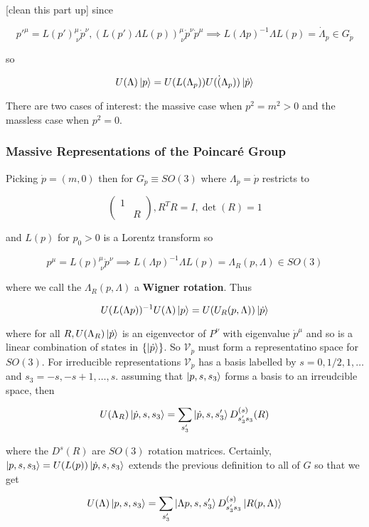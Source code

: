 \documentclass{article}
\theoremstyle{definition}
\begin{document}
[clean this part up] since

$$ p'^\mu = L(p')^\mu_{\ \nu} \dot{p}^\nu, (L(p') \Lambda L(p))^\mu_{\ \nu}
\dot{p}^\nu \dot{p}^\mu \implies L(\Lambda p)^{-1} \Lambda L(p) =
\dot{\Lambda}_p \in G_{\dot{p}} $$

so

$$ U(\Lambda) \ket{p} = U(L(\Lambda_p)) U(\dot(\Lambda_p)) \ket{\dot{p}} $$

There are two cases of interest: the massive case when $p^2 = m^2 > 0$ and the
massless case when $p^2 = 0$.

\subsubsection{Massive Representations of the Poincar\'{e} Group}

Picking $\dot{p} = (m, 0)$ then for  $G_{\dot{p}} \equiv SO(3)$ where
$\Lambda_{\dot{p}} = \dot{p}$ restricts to

$$
\begin{pmatrix}
  1 & \\
  & R
\end{pmatrix}
, R^T R = I, \det(R) = 1 $$

and $L(p)$ for $p_0 > 0$ is a Lorentz transform so

$$ p^\mu = L(p)^\mu_{\ \nu} \dot{p}^\nu \implies L(\Lambda p)^{-1} \Lambda L(p)
= \Lambda_R(p, \Lambda) \in SO(3) $$

where we call the $\Lambda_R(p, \Lambda)$ a \textbf{Wigner rotation}. Thus

$$ U(L(\Lambda p))^{-1} U(\Lambda) \ket{p} = U(U_R(p, \Lambda)) \ket{\dot{p}} $$

where for all $R, U(\Lambda_R) \ket{\dot{p}}$ is an eigenvector of $P^\nu$ with
eigenvalue $\dot{p}^\mu$ and so is a linear combination of states in
$\{\ket{\dot{p}}\}$. So $\mathcal{V}_{\dot{p}}$ must form a representatino space
for $SO(3)$. For irreducible representations $\mathcal{V}_{\dot{p}}$ has a basis
labelled by $s=0, 1/2, 1, \dots$ and $s_3 = -s, -s + 1, \dots, s$. assuming
that $\ket{p, s, s_3}$ forms a basis to an irreudcible space, then

$$ U(\Lambda_R) \ket{\dot{p}, s, s_3} = \sum_{s'_3} \ket{\dot{p}, s, s'_3}
D^{(s)}_{s'_3 s_3} (R) $$

where the $D^s(R)$ are $SO(3)$ rotation matrices. Certainly, $\ket{p, s, s_3} =
U(L(p)) \ket{\dot{p}, s, s_3}$ extends the previous definition to all of $G$ so
that we get

$$ U(\Lambda) \ket{p, s, s_3} = \sum_{s'_3} \ket{\Lambda p, s, s'_3}
D^{(s)}_{s'_3 s_3} \ket{R(p, \Lambda)} $$
\end{document}
